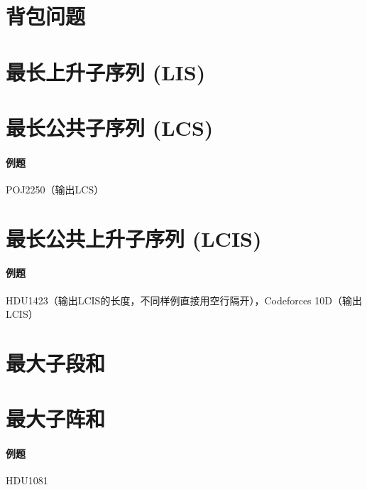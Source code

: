 \section{背包问题}



\section{最长上升子序列 (LIS)}





\section{最长公共子序列 (LCS)}

\paragraph{例题} POJ2250（输出LCS）



\section{最长公共上升子序列 (LCIS)}

\paragraph{例题} HDU1423（输出LCIS的长度，不同样例直接用空行隔开），Codeforces 10D（输出LCIS）



\section{最大子段和}


\section{最大子阵和}

\paragraph{例题} HDU1081


